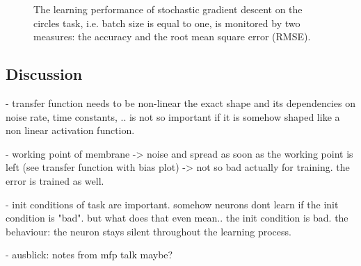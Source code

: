 \begin{figure}
	\label{circles_acc}
	\begin{center}
		
	\end{center}
	\caption{The learning performance of stochastic gradient descent on the circles task, i.e. batch size is equal to one, is monitored by two measures: the accuracy and the root mean square error (RMSE).}
\end{figure}
\subsection{Discussion}

- transfer function needs to be non-linear the exact shape and its dependencies on noise rate, time constants, .. is not so important if it is somehow shaped like a non linear activation function.

- working point of membrane -> noise and spread as soon as the working point is left (see transfer function with bias plot) -> not so bad actually for training. the error is trained as well. 

- init conditions of task are important. somehow neurons dont learn if the init condition is "bad". but what does that even  mean.. the init condition is bad. the behaviour: the neuron stays silent throughout the learning process. 

- ausblick: notes from mfp talk maybe?